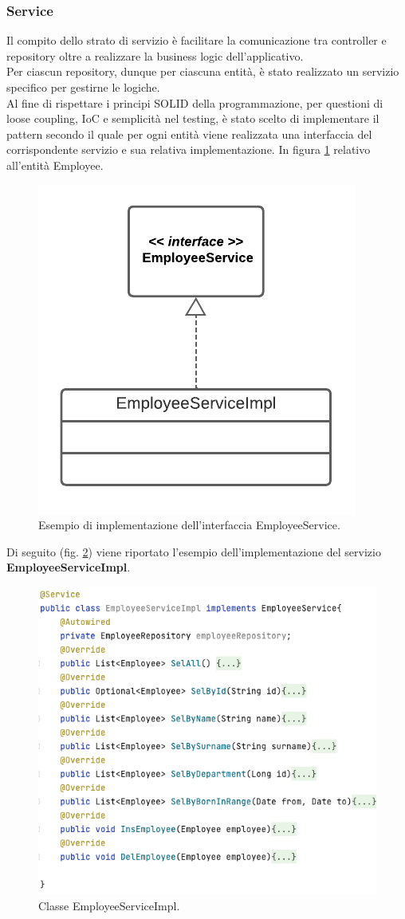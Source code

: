 \subsubsection*{Service}
Il compito dello strato di servizio è facilitare la comunicazione tra controller e repository oltre a realizzare la business logic dell'applicativo.\\
Per ciascun repository, dunque per ciascuna entità, è stato realizzato un servizio specifico per gestirne le logiche.\\
Al fine di rispettare i principi SOLID della programmazione, per questioni di loose coupling, IoC e semplicità nel testing, è stato scelto di implementare il pattern secondo il quale per ogni entità viene realizzata una interfaccia del corrispondente servizio e sua relativa implementazione. In figura \ref{service-serviceImpl} relativo all'entità Employee.
\FloatBarrier
\begin{figure}[!ht]
\centering
\includegraphics[width=0.3\linewidth]{immagini/service_serviceImpl.pdf}
\caption{Esempio di implementazione dell'interfaccia EmployeeService.}
\label{service-serviceImpl}
\end{figure}
\FloatBarrier
Di seguito (fig. \ref{employeeServiceImpl}) viene riportato l'esempio dell'implementazione del servizio \textbf{EmployeeServiceImpl}.
\FloatBarrier
\begin{figure}[!ht]
\begin{mdframed}
\centering
\includegraphics[width=1\linewidth]{immagini/employeeServiceImpl.png}
\end{mdframed}
\caption{Classe EmployeeServiceImpl.}
\label{employeeServiceImpl}
\end{figure}

